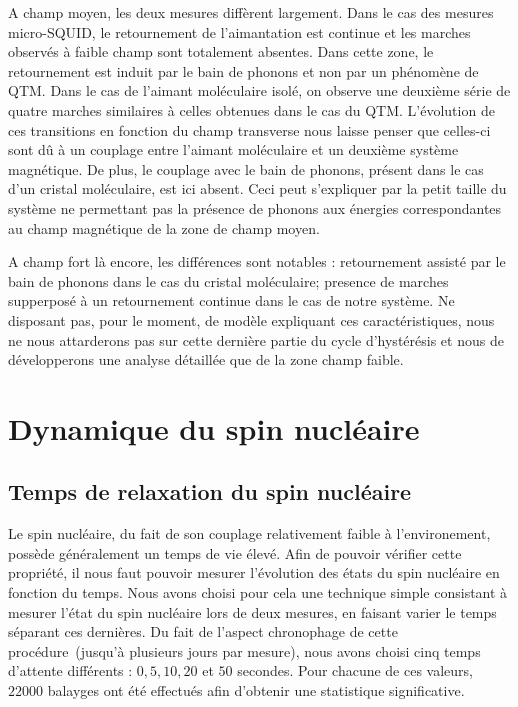 A champ moyen, les deux mesures diffèrent largement. Dans le cas des mesures micro-SQUID, le retournement de l'aimantation est continue et les marches observés à faible champ sont totalement absentes. Dans cette zone, le retournement est induit par le bain de phonons et non par un phénomène de QTM. Dans le cas de l'aimant moléculaire isolé, on observe une deuxième série de quatre marches similaires à celles obtenues dans le cas du QTM. L'évolution de ces transitions en fonction du champ transverse nous laisse penser que celles-ci sont d\^u à un couplage entre l'aimant moléculaire et un deuxième système magnétique. De plus, le couplage avec le bain de phonons, présent dans le cas d'un cristal moléculaire, est ici absent. Ceci peut s'expliquer par la petit taille du système ne permettant pas la présence de phonons aux énergies correspondantes au champ magnétique de la zone de champ moyen.

A champ fort là encore, les différences sont notables : retournement assisté par le bain de phonons dans le cas du cristal moléculaire; presence  de marches supperposé à un retournement continue dans le cas de notre système. Ne disposant pas, pour le moment, de modèle expliquant ces caractéristiques, nous ne nous attarderons pas sur cette dernière partie du cycle d’hystérésis et nous de développerons une analyse détaillée que de la zone champ faible.

\section{Dynamique du spin nucléaire}

\subsection{Temps de relaxation du spin nucléaire}
Le spin nucléaire, du fait de son couplage relativement faible à l'environement, possède généralement un temps de vie élevé. Afin de pouvoir vérifier cette propriété, il nous faut pouvoir mesurer l'évolution des états du spin nucléaire en fonction du temps. Nous avons choisi pour cela une technique simple consistant à mesurer l'état du spin nucléaire lors de deux mesures, en faisant varier le temps séparant ces dernières. Du fait de l'aspect chronophage de cette procédure~(jusqu'à plusieurs jours par mesure), nous avons choisi cinq temps d'attente différents : $0,5,10,20$ et $50$ secondes. Pour chacune de ces valeurs, $22000$ balayges ont été effectués afin d'obtenir une statistique significative.


